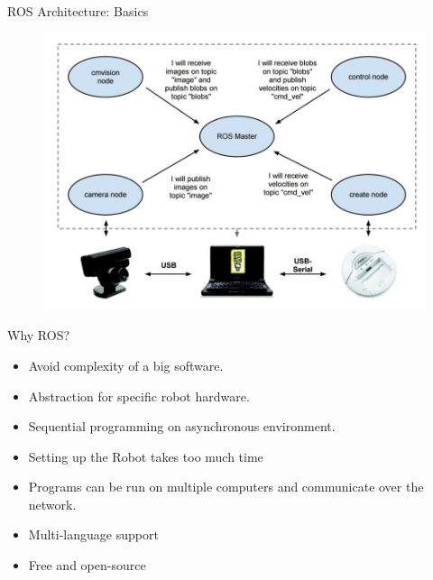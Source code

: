\documentclass{beamer}
\begin{document}
	\begin{frame}
		ROS Architecture: Basics
		\begin{figure}
			\includegraphics[scale=0.28]{ros_arc.jpeg}
		\end{figure}
	\end{frame}

	\begin{frame}
		Why ROS? \\
		\begin{itemize}
			\item Avoid complexity of a big software.
			\item Abstraction for specific robot hardware.
			\item Sequential programming on asynchronous environment.
			\item Setting up the Robot takes too much time
			\item Programs can be run on multiple computers and communicate over the network.
			\item Multi-language support
			\item Free and open-source
		\end{itemize}
	\end{frame}
\end{document}
